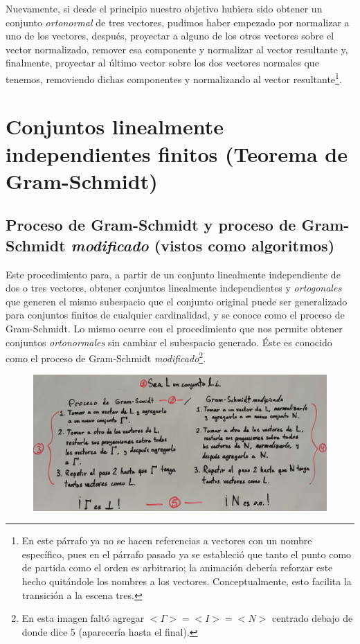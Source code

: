 \documentclass[12pt,dvipsnames]{article}
\numberwithin{equation}{section}
\begin{document}
Nuevamente, si desde el principio nuestro objetivo hubiera sido obtener un conjunto \emph{ortonormal} de tres vectores, pudimos haber empezado por normalizar a uno de los vectores, después, proyectar a alguno de los otros vectores sobre el vector normalizado, remover esa componente y normalizar al vector resultante y, finalmente, proyectar al último vector sobre los dos vectores normales que tenemos, removiendo dichas componentes y normalizando al vector resultante\footnote{En este párrafo ya no se hacen referencias a vectores con un nombre específico, pues en el párrafo pasado ya se estableció que tanto el punto como de partida como el orden es arbitrario; la animación debería reforzar este hecho quitándole los nombres a los vectores. Conceptualmente, esto facilita la transición a la escena tres.}.


\section{Conjuntos linealmente independientes finitos (Teorema de Gram-Schmidt)}

\subsection{Proceso de Gram-Schmidt y proceso de Gram-Schmidt \emph{modificado} (vistos como algoritmos)} \label{Ssec: Proceso de Gram-Schmidt (como algoritmo)}

Este procedimiento para, a partir de un conjunto linealmente independiente de dos o tres vectores, obtener conjuntos linealmente independientes y \emph{ortogonales} que generen el mismo subespacio que el conjunto original puede ser generalizado para conjuntos finitos de cualquier cardinalidad, y se conoce como el proceso de Gram-Schmidt. Lo mismo ocurre con el procedimiento que nos permite obtener conjuntos \emph{ortonormales} sin cambiar el subespacio generado. Éste es conocido como el proceso de Gram-Schmidt \emph{modificado}\footnote{En esta imagen faltó agregar $<\Gamma>=<I>=<N>$ centrado debajo de donde dice 5 (aparecería hasta el final).}. 


\begin{figure}[h!]
    \centering
    \includegraphics[width=16cm]{1.png}
\end{figure}
\end{document}
